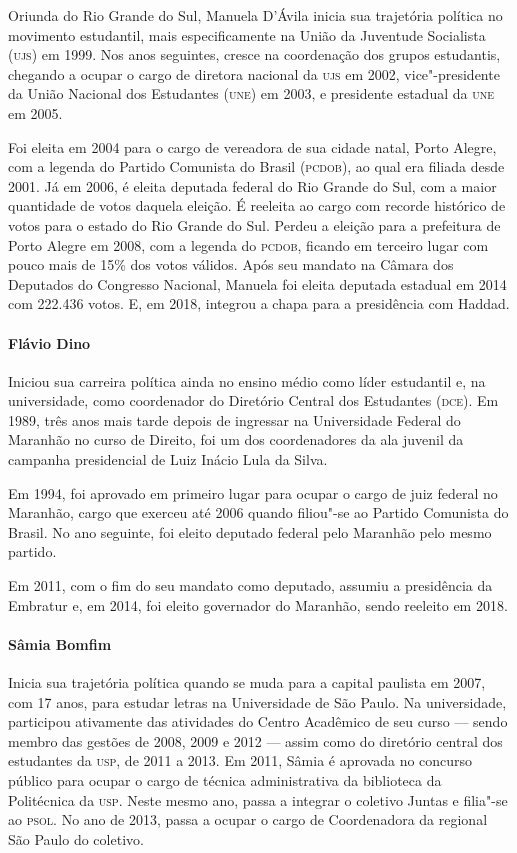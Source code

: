 Oriunda do Rio Grande do Sul, Manuela D'Ávila inicia sua trajetória
política no movimento estudantil, mais especificamente na União da
Juventude Socialista (\textsc{ujs}) em 1999. Nos anos seguintes, cresce na
coordenação dos grupos estudantis, chegando a ocupar o cargo de diretora
nacional da \textsc{ujs} em 2002, vice"-presidente da União Nacional dos
Estudantes (\textsc{une}) em 2003, e presidente estadual da \textsc{une} em 2005.

Foi eleita em 2004 para o cargo de vereadora de sua cidade natal, Porto
Alegre, com a legenda do Partido Comunista do Brasil (\textsc{pcdob}), ao qual
era filiada desde 2001. Já em 2006, é eleita deputada federal do Rio
Grande do Sul, com a maior quantidade de votos daquela eleição. É
reeleita ao cargo com recorde histórico de votos para o estado do Rio
Grande do Sul. Perdeu a eleição para a prefeitura de Porto Alegre em
2008, com a legenda do \textsc{pcdob}, ficando em terceiro lugar com pouco mais
de 15\% dos votos válidos. Após seu mandato na Câmara dos Deputados do
Congresso Nacional, Manuela foi eleita deputada estadual em 2014 com
222.436 votos. E, em 2018, integrou a chapa para a presidência com
Haddad.

\paragraph{Flávio Dino}

Iniciou sua carreira política ainda no ensino médio como líder
estudantil e, na universidade, como coordenador do Diretório Central dos
Estudantes (\textsc{dce}). Em 1989, três anos mais tarde depois de ingressar na
Universidade Federal do Maranhão no curso de Direito, foi um dos
coordenadores da ala juvenil da campanha presidencial de Luiz Inácio
Lula da Silva.

Em 1994, foi aprovado em primeiro lugar para ocupar o cargo de juiz
federal no Maranhão, cargo que exerceu até 2006 quando filiou"-se ao
Partido Comunista do Brasil. No ano seguinte, foi eleito deputado
federal pelo Maranhão pelo mesmo partido.

Em 2011, com o fim do seu mandato como deputado, assumiu a presidência
da Embratur e, em 2014, foi eleito governador do Maranhão, sendo
reeleito em 2018.

\paragraph{Sâmia Bomfim}

Inicia sua trajetória política quando se muda para a capital paulista em
2007, com 17 anos, para estudar letras na Universidade de São Paulo. Na
universidade, participou ativamente das atividades do Centro Acadêmico
de seu curso --- sendo membro das gestões de 2008, 2009 e 2012 --- assim
como do diretório central dos estudantes da \textsc{usp}, de 2011 a 2013. Em
2011, Sâmia é aprovada no concurso público para ocupar o cargo de
técnica administrativa da biblioteca da Politécnica da \textsc{usp}. Neste mesmo
ano, passa a integrar o coletivo Juntas e filia"-se ao \textsc{psol}. No ano de
2013, passa a ocupar o cargo de Coordenadora da regional São Paulo do
coletivo.

